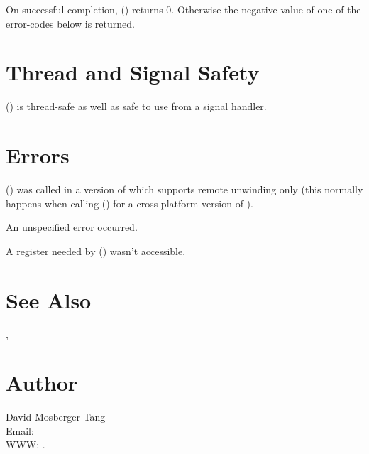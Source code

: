 \documentclass{article}
\begin{document}
On successful completion, () returns 0.
Otherwise the negative value of one of the error-codes below is
returned.

\section{Thread and Signal Safety}

() is thread-safe as well as safe to use from a
signal handler.

\section{Errors}

\begin{Description}
\item[\Const{UNW\_EINVAL}] () was called in a
  version of  which supports remote unwinding only
  (this normally happens when calling () for a
  cross-platform version of ).
\item[\Const{UNW\_EUNSPEC}] An unspecified error occurred.
\item[\Const{UNW\_EBADREG}] A register needed by ()
  wasn't accessible.
\end{Description}

\section{See Also}

, 

\section{Author}

\noindent
David Mosberger-Tang\\
Email: \\
WWW: .
\LatexManEnd
\end{document}
